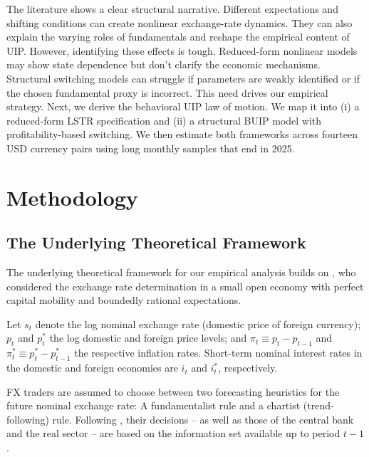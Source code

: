 \documentclass[a4paper,10pt,final]{article}    %
\begin{document}
The literature shows a clear structural narrative. Different expectations and shifting conditions can create nonlinear exchange-rate dynamics. They can also explain the varying roles of fundamentals and reshape the empirical content of UIP.
However, identifying these effects is tough. Reduced-form nonlinear models may show state dependence but don’t clarify the economic mechanisms. Structural switching models can struggle if parameters are weakly identified or if the chosen fundamental proxy is incorrect. This need drives our empirical strategy.
Next, we derive the behavioral UIP law of motion. We map it into (i) a reduced-form LSTR specification and (ii) a structural BUIP model with profitability-based switching. We then estimate both frameworks across fourteen USD currency pairs using long monthly samples that end in 2025.

\section{Methodology}
\label{chap:methodology}

\subsection{The Underlying Theoretical Framework}
\label{chap:theory}

The underlying theoretical framework for our empirical analysis builds on \citet{Proano2011,proano2013monetary}, who considered the exchange rate determination in a small open economy with perfect capital mobility and boundedly rational expectations.

Let $s_t$ denote the log nominal exchange rate (domestic price of foreign currency); $p_t$ and $p_t^{*}$ the log domestic and foreign price levels; and $\pi_t \equiv p_t - p_{t-1}$ and $\pi_t^{*} \equiv p_t^{*} - p_{t-1}^{*}$ the respective inflation rates. Short-term nominal interest rates in the domestic and foreign economies are $i_t$ and $i_t^{*}$, respectively.

FX traders are assumed to choose between two forecasting heuristics for the future nominal exchange rate: A fundamentalist rule and a chartist (trend-following) rule. Following \citet{Proano2011,proano2013monetary}, their decisions -- as well as those of the central bank and the real sector -- are based on the information set available up to period $t-1$.
\end{document}
